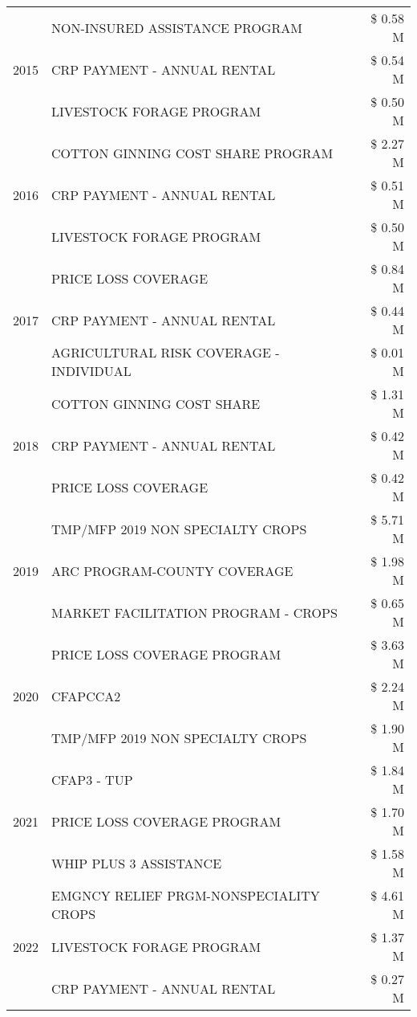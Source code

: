 \begin{tabular}{llr}
\cline{1-3}
\multirow[t]{3}{*}{2015} & NON-INSURED ASSISTANCE PROGRAM & \$ 0.58 M \\
 & CRP PAYMENT - ANNUAL RENTAL & \$ 0.54 M \\
 & LIVESTOCK FORAGE PROGRAM & \$ 0.50 M \\
\cline{1-3}
\multirow[t]{3}{*}{2016} & COTTON GINNING COST SHARE PROGRAM & \$ 2.27 M \\
 & CRP PAYMENT - ANNUAL RENTAL & \$ 0.51 M \\
 & LIVESTOCK FORAGE PROGRAM & \$ 0.50 M \\
\cline{1-3}
\multirow[t]{3}{*}{2017} & PRICE LOSS COVERAGE & \$ 0.84 M \\
 & CRP PAYMENT - ANNUAL RENTAL & \$ 0.44 M \\
 & AGRICULTURAL RISK COVERAGE - INDIVIDUAL & \$ 0.01 M \\
\cline{1-3}
\multirow[t]{3}{*}{2018} & COTTON GINNING COST SHARE & \$ 1.31 M \\
 & CRP PAYMENT - ANNUAL RENTAL & \$ 0.42 M \\
 & PRICE LOSS COVERAGE & \$ 0.42 M \\
\cline{1-3}
\multirow[t]{3}{*}{2019} & TMP/MFP 2019 NON SPECIALTY CROPS & \$ 5.71 M \\
 & ARC PROGRAM-COUNTY COVERAGE & \$ 1.98 M \\
 & MARKET FACILITATION PROGRAM - CROPS & \$ 0.65 M \\
\cline{1-3}
\multirow[t]{3}{*}{2020} & PRICE LOSS COVERAGE PROGRAM & \$ 3.63 M \\
 & CFAPCCA2 & \$ 2.24 M \\
 & TMP/MFP 2019 NON SPECIALTY CROPS & \$ 1.90 M \\
\cline{1-3}
\multirow[t]{3}{*}{2021} & CFAP3 - TUP & \$ 1.84 M \\
 & PRICE LOSS COVERAGE PROGRAM & \$ 1.70 M \\
 & WHIP PLUS 3 ASSISTANCE & \$ 1.58 M \\
\cline{1-3}
\multirow[t]{3}{*}{2022} & EMGNCY RELIEF PRGM-NONSPECIALITY CROPS & \$ 4.61 M \\
 & LIVESTOCK FORAGE PROGRAM & \$ 1.37 M \\
 & CRP PAYMENT - ANNUAL RENTAL & \$ 0.27 M \\
\cline{1-3}
\bottomrule
\end{tabular}
